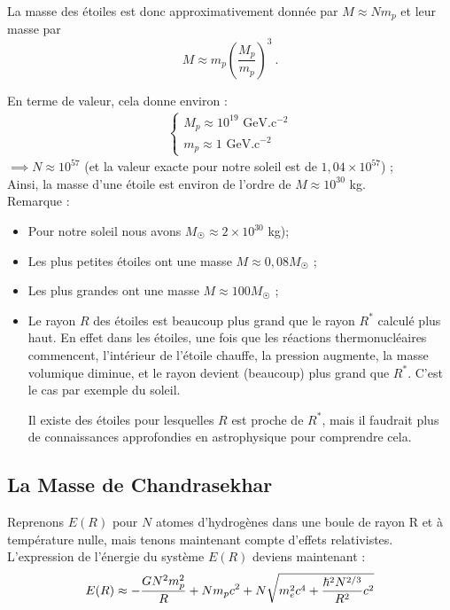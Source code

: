 \documentclass{book}
\newcommand\bg[2]{
\begin{center}
\fcolorbox{white}{BGgris}{\parbox{.9\linewidth}{\begin{large} \textit{#1} \end{large} \\
#2 }}
\end{center}}
\begin{document}
La masse des étoiles est donc approximativement donnée par $ M \approx Nm_p$ et leur masse par
\begin{equation}
    M \approx m_p \left( \frac{M_p}{m_p} \right)^3\ .
\end{equation}

En terme de valeur, cela donne environ : 
\begin{align*}
    \left\lbrace
\begin{array}{ccc}
M_p \approx 10^{19} \mbox{ GeV.c$^{-2}$} \\
m_p \approx 1 \mbox{ GeV.c$^{-2}$}
\end{array}\right.
\end{align*}
$\implies  N \approx 10^{57}$ (et la valeur exacte pour notre soleil est de $1,04 \times 10^{57}$) ; \\
Ainsi, la masse d'une étoile est environ de l'ordre de $M \approx 10^{30}$ kg. \\

Remarque :%
\begin{itemize}%
    \item Pour notre soleil nous avons $M_{\astrosun} \approx 2 \times 10^{30}$ kg);\\
    \item Les plus petites étoiles ont une masse $M \approx 0,08 M_{\astrosun}$ ; \\
    \item Les plus grandes ont une masse $M \approx 100 M_{\astrosun}$ ; \\
    \item 
  Le rayon $R$ des  étoiles est beaucoup plus grand que le rayon $R^*$ calculé plus haut. En effet dans les étoiles, une fois que les réactions thermonucléaires commencent, l'intérieur de l'étoile chauffe, la pression augmente, la masse volumique diminue, et le rayon devient (beaucoup) plus grand que $R^*$. C'est le cas par exemple du soleil.
 
 
    
    Il existe des étoiles pour lesquelles $R$ est proche de $R^*$, mais il faudrait plus de connaissances approfondies en astrophysique pour comprendre cela. 
\end{itemize} 

\subsection{La Masse de Chandrasekhar}

Reprenons $E(R)$ pour $N$ atomes d'hydrogènes dans une boule de rayon R et à température nulle, mais tenons maintenant compte d'effets relativistes.
L'expression de l'énergie du système $E(R)$  deviens maintenant : 
\begin{equation}
E(R) \approx - \frac{GN^2 m_p^2}{R} + N m_p c^2 + N \sqrt{m_e^2c^4 + \frac{\hbar^2N^{2/3}}{R^2}c^2} \\
\end{equation}
\end{document}
